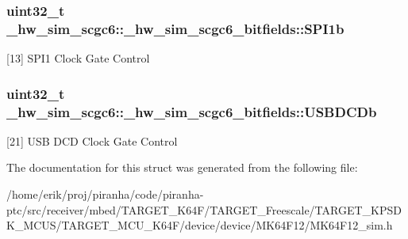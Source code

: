 \subsubsection[{\texorpdfstring{S\+P\+I1b}{SPI1b}}]{\setlength{\rightskip}{0pt plus 5cm}uint32\+\_\+t \+\_\+hw\+\_\+sim\+\_\+scgc6\+::\+\_\+hw\+\_\+sim\+\_\+scgc6\+\_\+bitfields\+::\+S\+P\+I1b}\hypertarget{struct__hw__sim__scgc6_1_1__hw__sim__scgc6__bitfields_acb175da00befcd5fd2fe73d3511f17b5}{}\label{struct__hw__sim__scgc6_1_1__hw__sim__scgc6__bitfields_acb175da00befcd5fd2fe73d3511f17b5}
\mbox{[}13\mbox{]} S\+P\+I1 Clock Gate Control 
\subsubsection[{\texorpdfstring{U\+S\+B\+D\+C\+Db}{USBDCDb}}]{\setlength{\rightskip}{0pt plus 5cm}uint32\+\_\+t \+\_\+hw\+\_\+sim\+\_\+scgc6\+::\+\_\+hw\+\_\+sim\+\_\+scgc6\+\_\+bitfields\+::\+U\+S\+B\+D\+C\+Db}\hypertarget{struct__hw__sim__scgc6_1_1__hw__sim__scgc6__bitfields_a4bdd01c77bcfd9e51047a156840950f3}{}\label{struct__hw__sim__scgc6_1_1__hw__sim__scgc6__bitfields_a4bdd01c77bcfd9e51047a156840950f3}
\mbox{[}21\mbox{]} U\+SB D\+CD Clock Gate Control 

The documentation for this struct was generated from the following file\+:\begin{DoxyCompactItemize}
\item 
/home/erik/proj/piranha/code/piranha-\/ptc/src/receiver/mbed/\+T\+A\+R\+G\+E\+T\+\_\+\+K64\+F/\+T\+A\+R\+G\+E\+T\+\_\+\+Freescale/\+T\+A\+R\+G\+E\+T\+\_\+\+K\+P\+S\+D\+K\+\_\+\+M\+C\+U\+S/\+T\+A\+R\+G\+E\+T\+\_\+\+M\+C\+U\+\_\+\+K64\+F/device/device/\+M\+K64\+F12/M\+K64\+F12\+\_\+sim.\+h\end{DoxyCompactItemize}
